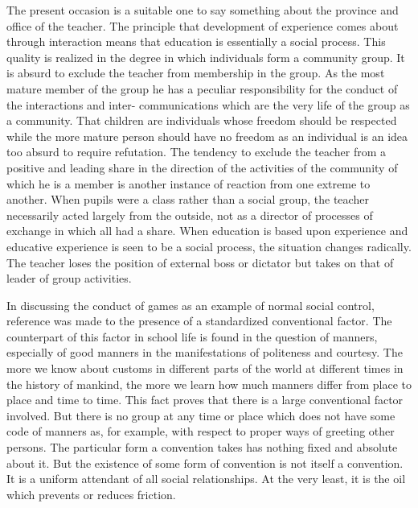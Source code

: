 The present occasion is a suitable one to say something about the province and office 
of the teacher. The principle that development of experience comes about through 
interaction means that education is essentially a social process. This quality is realized in 
the degree in which individuals form a community group. It is absurd to exclude the 
teacher from membership in the group. As the most mature member of the group he has a 
peculiar responsibility for the conduct of the interactions and inter- communications 
which are the very life of the group as a community. That children are individuals whose 
freedom should be respected while the more mature person should have no freedom as an 
individual is an idea too absurd to require refutation. The tendency to exclude the teacher 
from a positive and leading share in the direction of the activities of the community of 
which he is a member is another instance of reaction from one extreme to another. When 
pupils were a class rather than a social group, the teacher necessarily acted largely from 
the outside, not as a director of processes of exchange in which all had a share. When 
education is based upon experience and educative experience is seen to be a social 
process, the situation changes radically. The teacher loses the position of external boss or 
dictator but takes on that of leader of group activities. 

In discussing the conduct of games as an example of normal social control, reference 
was made to the presence of a standardized conventional factor. The counterpart of this 
factor in school life is found in the question of manners, especially of good manners in 
the manifestations of politeness and courtesy. The more we know about customs in 
different parts of the world at different times in the history of mankind, the more we learn 
how much manners differ from place to place and time to time. This fact proves that there 
is a large conventional factor involved. But there is no group at any time or place which 
does not have some code of manners as, for example, with respect to proper ways of 
greeting other persons. The particular form a convention takes has nothing fixed and 
absolute about it. But the existence of some form of convention is not itself a convention. 
It is a uniform attendant of all social relationships. At the very least, it is the oil which 
prevents or reduces friction. 

